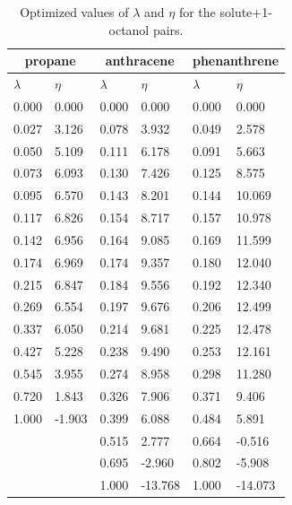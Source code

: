 \begin{table}[h]
	\centering
	\caption{Optimized values of $\lambda $ and $\eta$ for the solute+1-octanol pairs.}
	\begin{tabular}{llllll}
		\hline\hline
		\multicolumn{2}{c}{propane}& \multicolumn{2}{c}{anthracene}& \multicolumn{2}{c}{phenanthrene}\\
		\hline\hline
		$\lambda$ & $\eta$ & $\lambda$ & $\eta$  & $\lambda$ & $\eta$   \\ 
		\hline\hline
		0.000	&	0.000	&	0.000	&	0.000	&	0.000	&	0.000	\\
		0.027	&	3.126	&	0.078	&	3.932	&	0.049	&	2.578	\\
		0.050	&	5.109	&	0.111	&	6.178	&	0.091	&	5.663	\\
		0.073	&	6.093	&	0.130	&	7.426	&	0.125	&	8.575	\\
		0.095	&	6.570	&	0.143	&	8.201	&	0.144	&	10.069	\\
		0.117	&	6.826	&	0.154	&	8.717	&	0.157	&	10.978	\\
		0.142	&	6.956	&	0.164	&	9.085	&	0.169	&	11.599	\\
		0.174	&	6.969	&	0.174	&	9.357	&	0.180	&	12.040	\\
		0.215	&	6.847	&	0.184	&	9.556	&	0.192	&	12.340	\\
		0.269	&	6.554	&	0.197	&	9.676	&	0.206	&	12.499	\\
		0.337	&	6.050	&	0.214	&	9.681	&	0.225	&	12.478	\\
		0.427	&	5.228	&	0.238	&	9.490	&	0.253	&	12.161	\\
		0.545	&	3.955	&	0.274	&	8.958	&	0.298	&	11.280	\\
		0.720	&	1.843	&	0.326	&	7.906	&	0.371	&	9.406	\\
		1.000	&	-1.903	&	0.399	&	6.088	&	0.484	&	5.891	\\
		&		&	0.515	&	2.777	&	0.664	&	-0.516	\\
		&		&	0.695	&	-2.960	&	0.802	&	-5.908	\\
		&		&	1.000	&	-13.768	&	1.000	&	-14.073	\\
		\hline\hline
	\end{tabular}
\end{table}
